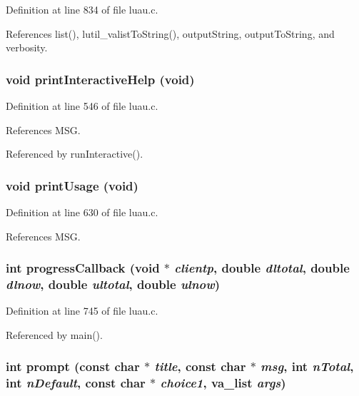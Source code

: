 Definition at line 834 of file luau.c.

References list(), lutil\_\-valist\-To\-String(), output\-String, output\-To\-String, and verbosity.
\subsubsection{\setlength{\rightskip}{0pt plus 5cm}void print\-Interactive\-Help (void)\hspace{0.3cm}{\tt  [static]}}\label{luau_8c_a10}




Definition at line 546 of file luau.c.

References MSG.

Referenced by run\-Interactive().
\subsubsection{\setlength{\rightskip}{0pt plus 5cm}void print\-Usage (void)\hspace{0.3cm}{\tt  [static]}}\label{luau_8c_a4}




Definition at line 630 of file luau.c.

References MSG.
\subsubsection{\setlength{\rightskip}{0pt plus 5cm}int progress\-Callback (void $\ast$ {\em clientp}, double {\em dltotal}, double {\em dlnow}, double {\em ultotal}, double {\em ulnow})\hspace{0.3cm}{\tt  [static]}}\label{luau_8c_a13}




Definition at line 745 of file luau.c.

Referenced by main().
\subsubsection{\setlength{\rightskip}{0pt plus 5cm}int prompt (const char $\ast$ {\em title}, const char $\ast$ {\em msg}, int {\em n\-Total}, int {\em n\-Default}, const char $\ast$ {\em choice1}, va\_\-list {\em args})\hspace{0.3cm}{\tt  [static]}}\label{luau_8c_a14}




